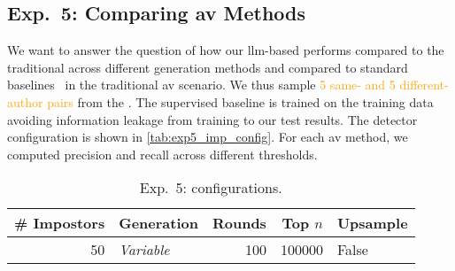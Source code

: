 \subsection{Exp.\ 5: Comparing \acs{av} Methods}%
\label{subsec:imp_gen}

We want to answer the question of how our \ac{llm}-based \impAppr{} performs compared to the traditional \impAppr{} across different generation methods and compared to standard baselines~\citep{koppel_determining_2014} %
in the traditional \ac{av} scenario.
We thus sample \textcolor{orange}{5 same- and 5 different-author pairs} from the \dataStudent{}. %
The supervised baseline is trained on the training data avoiding information leakage from training to our test results.
The \impAppr{} 
detector configuration is shown in \autoref{tab:exp5_imp_config}. %
For each \ac{av} method, we computed precision and recall across different thresholds. 

\begin{table}[h]
\centering\small
\caption{Exp.\ 5: \impAppr{} configurations.}
\label{tab:exp5_imp_config}
\begin{tabular}{@{}rlrrl@{}}   %
\toprule
\# Impostors & Generation & Rounds & Top $n$ & Upsample \\
\midrule
50 & \textit{Variable} & 100 & \num{100000} & False \\
\bottomrule
\end{tabular}%
\end{table}




